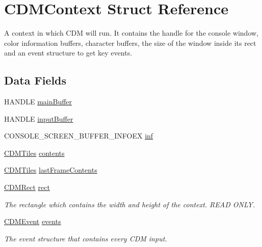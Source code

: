 \hypertarget{struct_c_d_m_context}{}\section{C\+D\+M\+Context Struct Reference}
\label{struct_c_d_m_context}


A context in which C\+DM will run. It contains the handle for the console window, color information buffers, character buffers, the size of the window inside it\textquotesingle{}s rect and an event structure to get key events.  


\subsection*{Data Fields}
\begin{DoxyCompactItemize}
\item 
H\+A\+N\+D\+LE \mbox{\hyperlink{struct_c_d_m_context_ad227f466f24fdd059e08e196f7fbab7f}{main\+Buffer}}
\item 
H\+A\+N\+D\+LE \mbox{\hyperlink{struct_c_d_m_context_adfe043e2777ad6c1ef5fc7a83b928d25}{input\+Buffer}}
\item 
C\+O\+N\+S\+O\+L\+E\+\_\+\+S\+C\+R\+E\+E\+N\+\_\+\+B\+U\+F\+F\+E\+R\+\_\+\+I\+N\+F\+O\+EX \mbox{\hyperlink{struct_c_d_m_context_a8476715d51a87d0e92e46b9be0ecd138}{inf}}
\item 
\mbox{\hyperlink{struct_c_d_m_tiles}{C\+D\+M\+Tiles}} \mbox{\hyperlink{struct_c_d_m_context_ac8c52228a53211702c5785f9c82e2f83}{contents}}
\item 
\mbox{\hyperlink{struct_c_d_m_tiles}{C\+D\+M\+Tiles}} \mbox{\hyperlink{struct_c_d_m_context_a489dca0960ee59a8f22f85c5b5fc6aed}{last\+Frame\+Contents}}
\item 
\mbox{\hyperlink{_c_d_m_8h_a23402dc2128c3c7f1e88e505a5631b9c}{C\+D\+M\+Rect}} \mbox{\hyperlink{struct_c_d_m_context_aa61e26c3b59930152cdaa0ce2dac8b14}{rect}}
\begin{DoxyCompactList}\small\item\em The rectangle which contains the width and height of the context. R\+E\+AD O\+N\+LY. \end{DoxyCompactList}\item 
\mbox{\hyperlink{struct_c_d_m_event}{C\+D\+M\+Event}} \mbox{\hyperlink{struct_c_d_m_context_ab97a0f3b9d5615487c4e542601499e94}{events}}
\begin{DoxyCompactList}\small\item\em The event structure that contains every C\+DM input. \end{DoxyCompactList}\end{DoxyCompactItemize}


